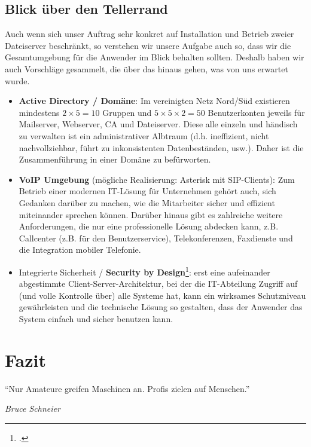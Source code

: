 \subsection{Blick über den Tellerrand}
\label{subsec:tellerrand}
Auch wenn sich unser Auftrag sehr konkret auf Installation und Betrieb zweier Dateiserver beschränkt, so verstehen wir unsere Aufgabe auch so, dass wir die Gesamtumgebung für die Anwender im Blick behalten sollten. Deshalb haben wir auch Vorschläge gesammelt, die über das hinaus gehen, was von uns erwartet wurde.
\begin{itemize}
\item \textbf{Active Directory / Domäne}: Im vereinigten Netz Nord/Süd existieren mindestens $2 \times 5 = 10$ Gruppen und $5 \times 5 \times 2 = 50$ Benutzerkonten jeweils für Mailserver, Webserver, CA und Dateiserver. Diese alle einzeln und händisch zu verwalten ist ein administrativer Albtraum (d.h. ineffizient, nicht nachvollziehbar, führt zu inkonsistenten Datenbeständen, usw.). Daher ist die Zusammenführung in einer Domäne zu befürworten.
\item \textbf{VoIP Umgebung} (mögliche Realisierung: Asterisk mit SIP-Clients): Zum Betrieb einer modernen IT-Lösung für Unternehmen gehört auch, sich Gedanken darüber zu machen, wie die Mitarbeiter sicher und effizient miteinander sprechen können. Darüber hinaus gibt es zahlreiche weitere Anforderungen, die nur eine professionelle Lösung abdecken kann, z.B. Callcenter (z.B. für den Benutzerservice), Telekonferenzen, Faxdienste und die Integration mobiler Telefonie.
\item Integrierte Sicherheit / \textbf{Security by Design}\footcite{waidner2013entwicklung}: erst eine aufeinander abgestimmte Client-Server-Architektur, bei der die IT-Abteilung Zugriff auf (und volle Kontrolle über) alle Systeme hat, kann ein wirksames Schutzniveau gewährleisten und die technische Lösung so gestalten, dass der Anwender das System einfach und sicher benutzen kann.
\end{itemize}
\newpage
\section{Fazit}
\setlength{\epigraphwidth}{.4\textwidth}
\epigraph{"`Nur Amateure greifen Maschinen an. Profis zielen auf Menschen."'}{\textit{Bruce Schneier}}

